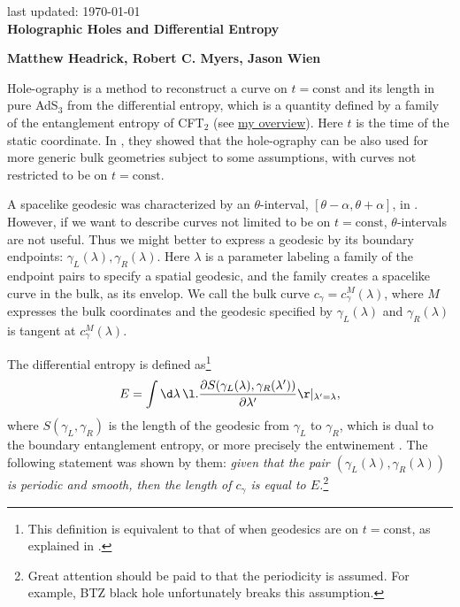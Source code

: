\documentclass[12pt]{article}
\date{}
\renewcommand{\thefootnote}{\fnsymbol{footnote}}
\begin{document}
{\Large{}
\hfill{\normalsize last updated: \today}
\\[2mm]
\textbf{Holographic Holes and Differential Entropy\cite{Headrick:2014eia}
}
}

\noindent
\hfill
\textbf{Matthew Headrick, Robert C. Myers, Jason Wien}%

\renewcommand{\thefootnote}{\arabic{footnote})}
\setcounter{footnote}{0}
\vspace{12pt}

Hole-ography is a method to reconstruct a curve on $t=\mathrm{const}$ and its length in pure AdS$_3$ from the differential entropy, which is a quantity defined by a family of the entanglement entropy of CFT$_2$ \cite{Balasubramanian:2013lsa} (see \href{https://albertmcc.github.io/web/overview_papers/Hole_ographic_spacetime.pdf}{\color{blue}my overview}).
Here $t$ is the time of the static coordinate.
In \cite{Headrick:2014eia}, they showed that the hole-ography can be also used for more generic bulk geometries subject to some assumptions, with curves not restricted to be on $t=\mathrm{const}$.

A spacelike geodesic was characterized by an $\theta$-interval, $[\theta-\alpha,\theta + \alpha]$, in \cite{Balasubramanian:2013lsa}.
However, if we want to describe curves not limited to be on $t = \mathrm{const}$,  $\theta$-intervals are not useful.
Thus we might better to express a geodesic by its boundary endpoints: $\gamma_L(\lambda),\gamma_R(\lambda)$.
Here $\lambda$ is a parameter labeling a family of the endpoint pairs to specify a spatial geodesic, and the family creates a spacelike curve in the bulk, as its envelop.
We call the bulk curve $c_\gamma = c_\gamma^M(\lambda)$, where $M$ expresses the bulk coordinates and the geodesic specified by $\gamma_L(\lambda)$ and $\gamma_R(\lambda)$ is tangent at $c_\gamma^M(\lambda)$.

The differential entropy is defined as\footnote{
This definition is equivalent to that of \cite{Balasubramanian:2013lsa} when geodesics are on $t = \mathrm{const}$, as explained in \cite{Headrick:2014eia}.
}
\begin{align}
	E = \int\d\lambda\,  \l.\frac{\partial S(\gamma_L(\lambda),\gamma_R(\lambda'))}{\partial \lambda'}\r|_{\lambda' = \lambda},
	\label{eq: differential entropy}
\end{align}
where $S(\gamma_L,\gamma_R)$ is the length of the geodesic from $\gamma_L$ to $\gamma_R$, which is dual to the boundary entanglement entropy, or more precisely the entwinement \cite{Balasubramanian:2014sra}.
The following statement was shown by them: \textit{given that the pair $(\gamma_L(\lambda),\gamma_R(\lambda))$ is periodic and smooth, then the length of $c_\gamma$ is equal to $E$.}\footnote{
Great attention should be paid to that the periodicity is assumed.
For example, BTZ black hole unfortunately breaks this assumption.
}
\end{document}

